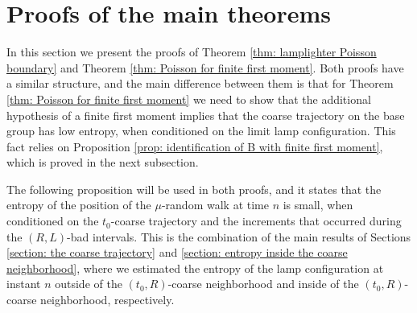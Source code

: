 \documentclass[reqno,oneside,11pt]{amsart}
\theoremstyle{plain}
\theoremstyle{definition}
\begin{document}
\section{Proofs of the main theorems}\label{section: proofs of the main theorems}
In this section we present the proofs of Theorem \ref{thm: lamplighter Poisson boundary} and Theorem \ref{thm: Poisson for finite first moment}. Both proofs have a similar structure, and the main difference between them is that for Theorem \ref{thm: Poisson for finite first moment} we need to show that the additional hypothesis of a finite first moment implies that the coarse trajectory on the base group has low entropy, when conditioned on the limit lamp configuration. This fact relies on Proposition \ref{prop: identification of B with finite first moment}, which is proved in the next subsection.


The following proposition will be used in both proofs, and it states that the entropy of the position of the $\mu$-random walk at time $n$ is small, when conditioned on the $t_0$-coarse trajectory and the increments that occurred during the $(R,L)$-bad intervals. This is the combination of the main results of Sections \ref{section: the coarse trajectory} and \ref{section: entropy inside the coarse neighborhood}, where we estimated the entropy of the lamp configuration at instant $n$ outside of the $(t_0,R)$-coarse neighborhood and inside of the $(t_0,R)$-coarse neighborhood, respectively.
\end{document}
